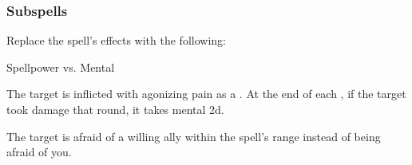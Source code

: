 \subsubsection{Subspells}





Replace the spell's effects with the following:
\begin{spellcontent}

\begin{augmenteffects}




\begin{spellattack}{Spellpower vs. Mental}


\hit
The target is inflicted with agonizing pain as a .
At the end of each , if the target took damage that round, it takes mental  \minus2d.



\end{spellattack}





\end{augmenteffects}

\end{spellcontent}






The target is afraid of a willing ally within the spell's range instead of being afraid of you.









